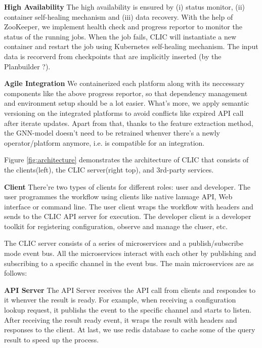 \textbf{High Availability}               The high availability is ensured by (i) status monitor, (ii) container self-healing mechanism and (iii) data recovery. With the help of ZooKeeper, we implement health check and progress reportor to monitor the status of the running jobs. When the job fails, CLIC will instantiate a new container and restart the job using Kubernetes self-healing mechanism. The input data is recorverd from checkpoints that are implicitly inserted (by the Planbuilder ?).

\textbf{Agile Integration}               We containerized each platform along with its neccessary components like the above progress reportor, so that dependency management and environment setup should be a lot easier. What's more, we apply semantic versioning on the integrated platforms to avoid conflicts like expired API call after iterate updates. Apart from that, thanks to the feature extraction method, the GNN-model doesn't need to be retrained whenver there's a newly operator/platform anymore, i.e. is compatible for an integration.

Figure \ref{fig:architecture} demonstrates the architecture of CLIC that consists of the clients(left), the CLIC server(right top), and 3rd-party services.

\textbf{Client}  There're two types of clients for different roles: user and developer. The user programmes the workflow using clients like native lanuage API, Web interface or command line. The user client wraps the workflow with headers and sends to the CLIC API server for execution. The developer client is a developer toolkit for registering configuration, observe and manage the cluser, etc.

The CLIC server consists of a series of microservices and a publish/subscribe mode event bus. All the microservices interact with each other by publishing and subscribing to a specific channel in the event bus. The main microservices are as follows:

\textbf{API Server}  The API Server receives the API call from clients and respondes to it whenver the result is ready. For example, when receiving a configuration lookup request, it publishs the event to the specific channel and starts to listen. After receiving the result ready event, it wraps the result with headers and responses to the client. At last, we use redis database to cache some of the query result to speed up the process.


